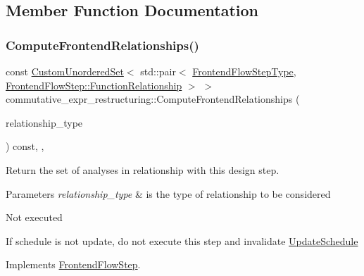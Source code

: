 \subsection{Member Function Documentation}
\mbox{\label{classcommutative__expr__restructuring_af7722e53fe6fae4fb5aab7bfbb5146e3}} 
\subsubsection{\texorpdfstring{Compute\+Frontend\+Relationships()}{ComputeFrontendRelationships()}}
{\footnotesize\ttfamily const \hyperlink{classCustomUnorderedSet}{Custom\+Unordered\+Set}$<$ std\+::pair$<$ \hyperlink{frontend__flow__step_8hpp_afeb3716c693d2b2e4ed3e6d04c3b63bb}{Frontend\+Flow\+Step\+Type}, \hyperlink{classFrontendFlowStep_af7cf30f2023e5b99e637dc2058289ab0}{Frontend\+Flow\+Step\+::\+Function\+Relationship} $>$ $>$ commutative\+\_\+expr\+\_\+restructuring\+::\+Compute\+Frontend\+Relationships (\begin{DoxyParamCaption}\item[{const \hyperlink{classDesignFlowStep_a723a3baf19ff2ceb77bc13e099d0b1b7}{Design\+Flow\+Step\+::\+Relationship\+Type}}]{relationship\+\_\+type }\end{DoxyParamCaption}) const\hspace{0.3cm}{\ttfamily [override]}, {\ttfamily [private]}, {\ttfamily [virtual]}}



Return the set of analyses in relationship with this design step. 


\begin{DoxyParams}{Parameters}
{\em relationship\+\_\+type} & is the type of relationship to be considered \\
\hline
\end{DoxyParams}
Not executed

If schedule is not update, do not execute this step and invalidate \hyperlink{classUpdateSchedule}{Update\+Schedule} 

Implements \hyperlink{classFrontendFlowStep_abeaff70b59734e462d347ed343dd700d}{Frontend\+Flow\+Step}.



